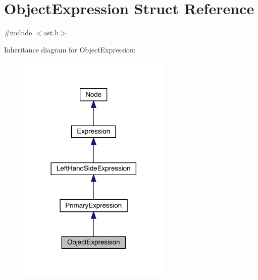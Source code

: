 \hypertarget{struct_object_expression}{}\section{Object\+Expression Struct Reference}
\label{struct_object_expression}


{\ttfamily \#include $<$ast.\+h$>$}



Inheritance diagram for Object\+Expression\+:
\nopagebreak
\begin{figure}[H]
\begin{center}
\leavevmode
\includegraphics[width=206pt]{struct_object_expression__inherit__graph}
\end{center}
\end{figure}


